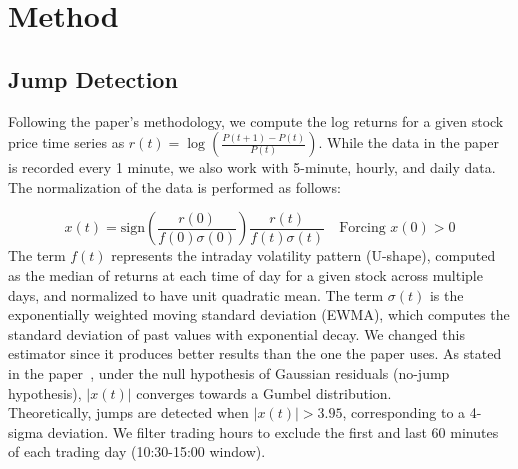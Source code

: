\documentclass[11pt,a4paper]{article}
\begin{document}

\section{Method}


\subsection{Jump Detection}

Following the paper's methodology, we compute the log returns for a given stock price time series as 
$r(t) = \log\left(\frac{P(t+1)-P(t)}{P(t)}\right)$. While the data in the paper is recorded every 1 minute, we also work with 5-minute, hourly, and daily data. The normalization of the data is performed as follows:

\begin{equation}
x(t) = \text{sign}\left(\frac{r(0)}{f(0)\sigma(0) }\right)\frac{r(t)}{f(t)\sigma(t) } \quad\text{Forcing $x(0) > 0$}
\end{equation}
The term $f(t)$ represents the intraday volatility pattern (U-shape), computed as the median of returns at each time of day for a given stock across multiple days, and normalized to have unit quadratic mean. The term $\sigma(t)$ is the exponentially weighted moving standard deviation (EWMA), which computes the standard deviation of past values with exponential decay. We changed this estimator since it produces better results than the one the paper uses.  
As stated in the paper~\cite{aubrun2024ridingwaveletsmethoddiscover}, under the null hypothesis of Gaussian residuals (no-jump hypothesis), $|x(t)|$ converges towards a Gumbel distribution.\\

Theoretically, jumps are detected when $|x(t)| > 3.95$, corresponding to a 4-sigma deviation. We filter trading hours to exclude the first and last 60 minutes of each trading day (10:30-15:00 window).
\end{document}
